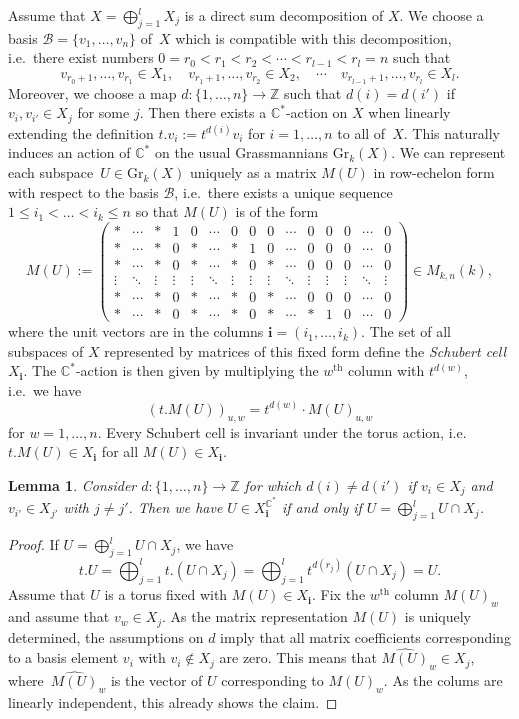 \documentclass{amsart}
\newtheorem{lemma}[theorem]{Lemma}
\numberwithin{equation}{section}
\newcommand{\bfi}{\mathbf{i}}
\newcommand{\C}{\mathbb{C}}
\newcommand{\Gr}{\mathrm{Gr}}
\newcommand{\ZZ}{\mathbb{Z}}
\begin{document}
Assume that $X=\bigoplus_{j=1}^l X_j$ is a direct sum decomposition of $X$.
We choose a basis $\mathcal B=\{v_1,\ldots,v_n\}$ of~$X$ which is compatible with this decomposition, i.e.\ there exist numbers $0=r_0<r_1<r_2<\cdots<r_{l-1}<r_l=n$ such that
\[v_{r_0+1},\ldots,v_{r_1}\in X_1,\quad v_{r_1+1},\ldots,v_{r_2}\in X_2,\quad\cdots\quad v_{r_{l-1}+1},\ldots,v_{r_l}\in X_l.\]
Moreover, we choose a map $d:\{1,\ldots,n\}\to\ZZ$ such that $d(i)=d(i')$ if $v_i,v_{i'}\in X_j$ for some $j$.
Then there exists a $\C^\ast$-action on $X$ when linearly extending the definition $t.v_i:=t^{d(i)}v_i$ for $i=1,\ldots,n$ to all of~$X$.
This naturally induces an action of $\C^\ast$ on the usual Grassmannians $\Gr_k(X)$.
We can represent each subspace~$U\in\Gr_k(X)$ uniquely as a matrix $M(U)$ in row-echelon form with respect to the basis $\mathcal B$, i.e.\ there exists a unique sequence $1\leq i_1<\ldots<i_k\leq n$ so that $M(U)$ is of the form
\[M(U):=
  \begin{pmatrix}
    \ast&\cdots &\ast &1&0 &\cdots& 0 & 0 & 0 &\cdots&0&0&0&\cdots&0\\
    \ast&\cdots &\ast&0&\ast&\cdots &\ast&1&0&\cdots&0&0&0&\cdots&0\\
    \ast &\cdots&\ast&0&\ast &\cdots&\ast&0&\ast&\cdots&0&0&0&\cdots&0\\[-0.4em]
    \vdots &\ddots&\vdots&\vdots&\vdots &\ddots&\vdots&\vdots&\vdots&\ddots&\vdots&\vdots&\vdots&\ddots&\vdots\\
    \ast&\cdots &\ast&0&\ast&\cdots &\ast&0&\ast&\cdots&0&0&0&\cdots&0\\
    \ast&\cdots &\ast&0&\ast&\cdots &\ast&0&\ast&\cdots&\ast&1&0&\cdots&0
  \end{pmatrix}\in M_{k,n}(k),\]
where the unit vectors are in the columns $\bfi=(i_1,\ldots,i_k)$.
The set of all subspaces of $X$ represented by matrices of this fixed form define the \emph{Schubert cell} $X_\bfi$.
The $\C^\ast$-action is then given by multiplying the $w^{\mathrm{th}}$ column with $t^{d(w)}$, i.e.\ we have
\[(t.M(U))_{u,w}=t^{d(w)}\cdot M(U)_{u,w}\]
for $w=1,\ldots,n$.
Every Schubert cell is invariant under the torus action, i.e.\ $t.M(U)\in X_\bfi$ for all $M(U)\in X_{\bfi}$. 
\begin{lemma}
  \label{usualGrass}
  Consider $d:\{1,\ldots,n\}\to\ZZ$ for which $d(i)\neq d(i')$ if $v_i\in X_j$ and $v_{i'}\in X_{j'}$ with $j\neq j'$.
  Then we have $U\in X_{\bfi}^{\C^\ast}$ if and only if $U=\bigoplus_{j=1}^l U\cap X_j$.
\end{lemma}
\begin{proof}
  If $U=\bigoplus_{j=1}^l U\cap X_j$, we have 
  \[t.U=\bigoplus_{j=1}^l t.(U\cap X_j)=\bigoplus_{j=1}^l t^{d(r_j)}(U\cap X_j)=U.\]
  Assume that $U$ is a torus fixed with $M(U)\in X_{\bfi}$.
  Fix the $w^{\mathrm{th}}$ column $M(U)_w$ and assume that $v_w\in X_j$. 
  As the matrix representation $M(U)$ is uniquely determined, the assumptions on $d$ imply that all matrix coefficients corresponding to a basis element $v_i$ with $v_i\notin X_j$ are zero.
  This means that $\widehat{M(U)}_w\in X_j$, where~$\widehat{M(U)}_w$ is the vector of $U$ corresponding to $M(U)_w$.
  As the colums are linearly independent, this already shows the claim.
\end{proof}
\end{document}
